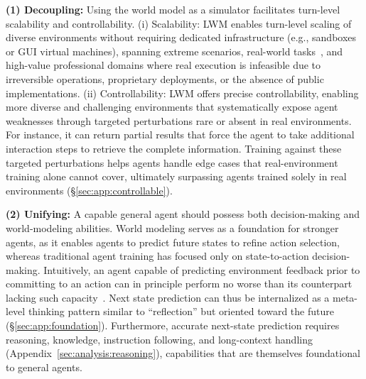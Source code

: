 \documentclass{llmxive}
\begin{document}
\begin{tcolorbox}[
  enhanced,
  colback=boxwarm!30,
  colframe=boxbrown!80,
  colbacktitle=boxwarm,
  coltitle=boxbrown!90!black,
  fonttitle=\small,
  title={\textbf{Why Language World Models When Real Environments Exist?}\\{Not for Cost Reduction, but as a Complementary Axis for Pushing the Frontier}},
  boxrule=0.5pt,
  arc=1.5pt,
  left=8pt, right=8pt, top=4pt, bottom=4pt,
  toptitle=3pt, bottomtitle=3pt,
]
\textbf{(1) Decoupling:} Using the world model as a simulator facilitates turn-level scalability and controllability.
(i) Scalability:
LWM enables turn-level scaling of diverse environments without requiring dedicated infrastructure (e.g., sandboxes or GUI virtual machines), spanning extreme scenarios, real-world tasks~\citep{openclaw2026,patwardhan2025gdpval}, and high-value professional domains where real execution is infeasible due to irreversible operations, proprietary deployments, or the absence of public implementations.
(ii) Controllability:
LWM offers precise controllability, enabling more diverse and challenging environments that systematically expose agent weaknesses through targeted perturbations rare or absent in real environments.
For instance, it can return partial results that force the agent to take additional interaction steps to retrieve the complete information.
Training against these targeted perturbations helps agents handle edge cases that real-environment training alone cannot cover, ultimately surpassing agents trained solely in real environments (\S\ref{sec:app:controllable}).

\smallskip
\textbf{(2) Unifying:} A capable general agent should possess both decision-making and world-modeling abilities.
World modeling serves as a foundation for stronger agents, as it enables agents to predict future states to refine action selection, whereas traditional agent training has focused only on state-to-action decision-making.
Intuitively, an agent capable of predicting environment feedback prior to committing to an action can in principle perform no worse than its counterpart lacking such capacity~\citep{richens2025general}.
Next state prediction can thus be internalized as a meta-level thinking pattern similar to ``reflection'' but oriented toward the future (\S\ref{sec:app:foundation}).
Furthermore, accurate next-state prediction requires reasoning, knowledge, instruction following, and long-context handling (Appendix~\ref{sec:analysis:reasoning}), capabilities that are themselves foundational to general agents.
\end{tcolorbox}
\end{document}
